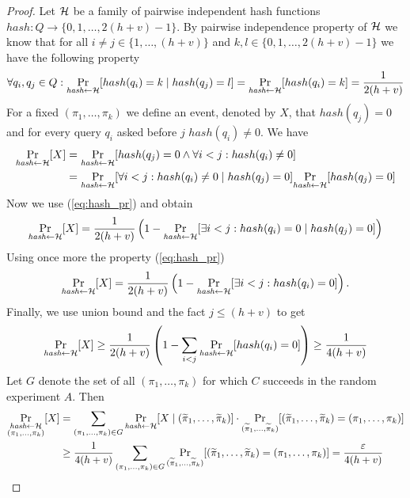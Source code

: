 \begin{proof}
Let $\mathcal{H}$ be a family of pairwise independent hash functions $hash : Q \rightarrow \{0,1, \dots,2(h+v)-1\}$.
By pairwise independence property of $\mathcal{H}$ we know that for all $i \neq j \in \{1, \dots, (h+v)\}$ and $k,l \in \{0,1,\dots,2(h+v)-1\}$
we have the following property
\begin{align}
  \label{eq:hash_pr}
 \forall q_i,q_j \in Q : \underset{\textit{hash} \leftarrow \mathcal{H}}{\Pr}[hash(q_i) = k \mid hash(q_j) = l] = \underset{\textit{hash} \leftarrow \mathcal{H}}{\Pr}[hash(q_i) = k] = \frac{1}{2(h+v)}
\end{align}
For a fixed $(\pi_1, \dots, \pi_k)$ we define an event, denoted by $X$, that $hash(q_j) = 0$ and for every query $q_i$ asked before $j$ $hash(q_i) \neq 0$.
We have
\begin{align*}
  \underset{\textit{hash} \leftarrow \mathcal{H}}{\Pr}[X] &= \underset{\textit{hash} \leftarrow \mathcal{H}}{\Pr}[hash(q_j) = 0 \land \forall i < j : hash(q_i) \neq 0] \\
  &=\underset{\textit{hash} \leftarrow \mathcal{H}}{\Pr}[\forall i < j : hash(q_i) \neq 0 \mid hash(q_j) = 0] \underset{\textit{hash} \leftarrow \mathcal{H}}{\Pr}[hash(q_j) = 0]\\
\end{align*}
Now we use (\ref{eq:hash_pr}) and obtain
\begin{align*}
\underset{\textit{hash} \leftarrow \mathcal{H}}{\Pr}[X] =
\frac{1}{2(h+v)}\left(1 -\underset{\textit{hash} \leftarrow \mathcal{H}}{\Pr}[\exists i < j : hash(q_i) = 0 \mid hash(q_j) = 0] \right)
\end{align*}
Using once more the property (\ref{eq:hash_pr})
\begin{align*}
\underset{\textit{hash} \leftarrow \mathcal{H}}{\Pr}[X] = \frac{1}{2(h+v)} \left( 1 -\underset{\textit{hash} \leftarrow \mathcal{H}}{\Pr}[\exists i < j : hash(q_i) = 0] \right).
\end{align*}
Finally, we use union bound and the fact $j \leq (h+v)$ to get
\begin{align*}
\underset{\textit{hash} \leftarrow \mathcal{H}}{\Pr}[X] \geq
\frac{1}{2(h+v)} \left( 1 - \sum_{i < j} \underset{\textit{hash} \leftarrow \mathcal{H}}{\Pr}[hash(q_i) = 0] \right) \geq \frac{1}{4(h+v)}
\end{align*}
Let $G$ denote the set of all $(\pi_1, \dots, \pi_k)$ for which $C$ succeeds in the random experiment $A$.
Then
\begin{align*}
\underset{\substack{\textit{hash} \leftarrow \mathcal{H} \\ (\pi_1, \dots, \pi_k)}}{\Pr}[X] &=
\sum_{(\pi_1, \dots, \pi_k) \in G} \underset{\textit{hash} \leftarrow \mathcal{H}}{\Pr}[X \mid (\widetilde{\pi}_1, \dots, \widetilde{\pi}_k)] \cdot \underset{(\widetilde{\pi}_1, \dots, \widetilde{\pi}_k)}{\Pr}[(\widetilde{\pi}_1, \dots, \widetilde{\pi}_k) = (\pi_1, \dots, \pi_k)]\\
&\geq \frac{1}{4(h+v)} \sum_{(\pi_1, \dots, \pi_k) \in G} \underset{(\widetilde{\pi}_1, \dots, \widetilde{\pi}_k)}{\Pr}[(\widetilde{\pi}_1, \dots, \widetilde{\pi}_k) = (\pi_1, \dots, \pi_k)] = \frac{\varepsilon}{4(h+v)}
\end{align*}


\end{proof}
